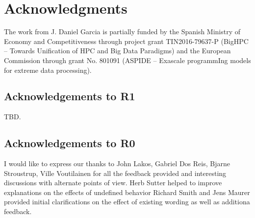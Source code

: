 \section*{Acknowledgments}

The work from J. Daniel Garcia is partially funded by
the Spanish Ministry of Economy and Competitiveness through project grant
TIN2016-79637-P (BigHPC -- Towards Unification of HPC and Big Data Paradigms)
and the European Commission through grant
No. 801091 (ASPIDE -- Exascale programmIng models for extreme data processing).

\subsection*{Acknowledgements to R1}

{\color{red}TBD.}

\subsection*{Acknowledgements to R0}

I would like to express our thanks to John Lakos, Gabriel Dos Reis, Bjarne
Stroustrup, Ville Voutilainen for all the feedback provided and interesting
discussions with alternate points of view.
Herb Sutter helped to improve explanations on the effects of undefined behavior
Richard Smith and Jens Maurer provided initial clarifications on the effect of
existing wording as well as additiona feedback.

